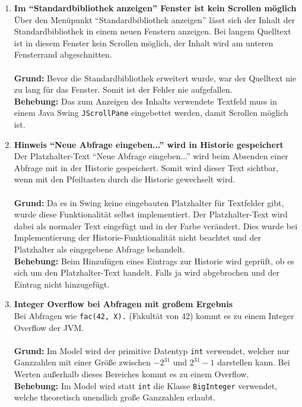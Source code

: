 \documentclass[parskip=full,11pt,twoside]{scrartcl}
\begin{document}
\begin{enumerate}[label=\#\arabic*]
  \item \textbf{Im \enquote{Standardbibliothek anzeigen} Fenster ist kein Scrollen möglich}\\
        Über den Menüpunkt \enquote{Standardbibliothek anzeigen} lässt sich der Inhalt der Standardbibliothek in einem neuen Fenstern anzeigen. Bei langem Quelltext ist in diesem Fenster kein Scrollen möglich, der Inhalt wird am unteren Fensterrand abgeschnitten.\\\\
        \textbf{Grund:} Bevor die Standardbibliothek erweitert wurde, war der Quelltext nie zu lang für das Fenster. Somit ist der Fehler nie aufgefallen.\\
        \textbf{Behebung:} Das zum Anzeigen des Inhalts verwendete Textfeld muss in einem Java Swing \texttt{JScrollPane} eingebettet werden, damit Scrollen möglich ist.

  \item \textbf{Hinweis \enquote{Neue Abfrage eingeben...} wird in Historie gespeichert}\\
        Der Platzhalter-Text \enquote{Neue Abfrage eingeben...} wird beim Absenden einer Abfrage mit in der Historie gespeichert. Somit wird dieser Text sichtbar, wenn mit den Pfeiltasten durch die Historie gewechselt wird.\\\\
        \textbf{Grund:} Da es in Swing keine eingebauten Platzhalter für Textfelder gibt, wurde diese Funktionalität selbst implementiert. Der Platzhalter-Text wird dabei als normaler Text eingefügt und in der Farbe verändert. Dies wurde bei Implementierung der Historie-Funktionalität nicht beachtet und der Platzhalter als eingegebene Abfrage behandelt.\\
        \textbf{Behebung:} Beim Hinzufügen eines Eintrags zur Historie wird geprüft, ob es sich um den Platzhalter-Text handelt. Falls ja wird abgebrochen und der Eintrag nicht hinzugefügt.

  \item \textbf{Integer Overflow bei Abfragen mit großem Ergebnis}\\
        Bei Abfragen wie \texttt{fac(42, X).} (Fakultät von 42) kommt es zu einem Integer Overflow der JVM.\\\\
        \textbf{Grund:} Im Model wird der primitive Datentyp \texttt{int} verwendet, welcher nur Ganzzahlen mit einer Größe zwischen $-2^{31}$ und $2^{31}-1$ darstellen kann. Bei Werten außerhalb dieses Bereiches kommt es zu einem Overflow.\\
        \textbf{Behebung:} Im Model wird statt \texttt{int} die Klasse \texttt{BigInteger} verwendet, welche theoretisch unendlich große Ganzzahlen erlaubt.


\end{enumerate}
\end{document}
